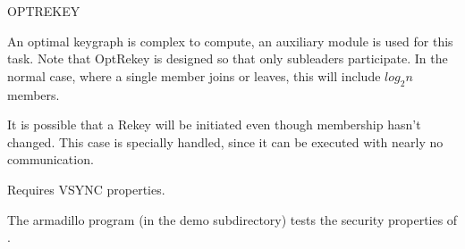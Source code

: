 \begin{Layer}{OPTREKEY}
\begin{Protocol}
An optimal keygraph is complex to compute, an auxiliary module is used
for this task. Note that OptRekey is designed so that only
subleaders participate. In the normal case, where a single member
joins or leaves, this will include $log_2n$ members.

It is possible that a Rekey will be initiated even though
membership hasn't changed. This case is specially handled, since it can
be executed with nearly no communication.
\end{Protocol}

\begin{Properties}
\item Requires VSYNC properties.
\end{Properties}

\begin{Sources}
\end{Sources}

\begin{GenEvent}
\genevent{\DnCast}
\genevent{\DnSend}
\end{GenEvent}

\begin{Testing}
\item 
The armadillo program (in the demo subdirectory) tests the security properties
of \ensemble.
\end{Testing}

\end{Layer}



